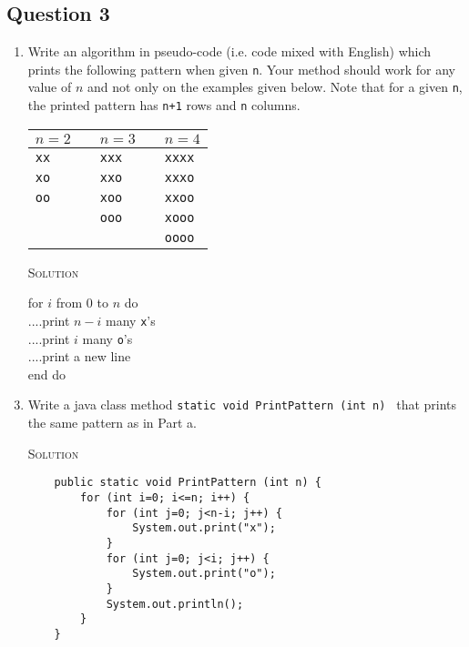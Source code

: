 \documentclass[12pt]{report}
\begin{document}
\subsection*{Question 3}
\begin{enumerate}
\item Write an algorithm in pseudo-code (i.e. code mixed with English) which prints the following pattern when given \texttt{n}. Your method should work for any value of $n$ and not only on the examples given below. 
Note that for a given \texttt{n}, the printed pattern has \texttt{n+1} rows
and \texttt{n} columns.

\begin{center}
\begin{tabular}{l  c l c l }
$n=2$ 		&\hspace{50px}\hfill	& $n=3$ 		&\hspace{50px}\hfill& $n=4$ \\
\hline
\texttt{xx}		&&\texttt{xxx}	&& \texttt{xxxx} \\
\texttt{xo}		&&\texttt{xxo}	&& \texttt{xxxo} \\
\texttt{oo}		&&\texttt{xoo}	&& \texttt{xxoo} \\
			&&\texttt{ooo}	&& \texttt{xooo} \\
			&&			&& \texttt{oooo} \\
\hline
\end{tabular}
\end{center}

\item[\textsc{Solution}] \blank

for $i$ from $0$ to $n$ do\\
....print $n-i$ many \texttt{x}'s\\
....print $i$ many \texttt{o}'s\\
....print a new line\\
end do
\vspace{1cm}

\item Write a java class method \texttt{static void PrintPattern (int n) } that prints the same pattern as in Part a.

\item[\textsc{Solution}]
\begin{verbatim}
    public static void PrintPattern (int n) {
        for (int i=0; i<=n; i++) {
            for (int j=0; j<n-i; j++) {
                System.out.print("x"); 
            }
            for (int j=0; j<i; j++) {
                System.out.print("o"); 
            }
            System.out.println();
        }
    }
\end{verbatim}

\end{enumerate}
\end{document}
